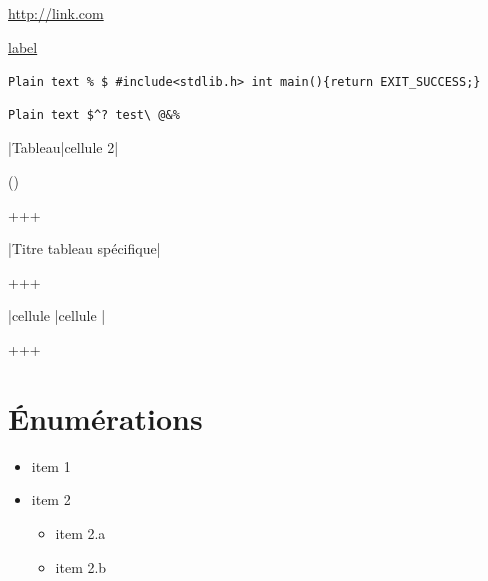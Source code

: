 \documentclass{article}
\begin{document}
		\url{http://link.com}

		\href{http://link.com/}{label}

		\verb?Plain text % $ #include<stdlib.h> int main(){return EXIT_SUCCESS;}?

		

\begin{verbatim}
Plain text $^? test\ @&%
\end{verbatim}
		

		\textendash \textendash 

		|Tableau|cellule 2|

		\textendash \textendash (\textendash \textendash \textendash \textendash \textendash \textendash \textendash \textendash \textendash \textendash \textendash \textendash \textendash \textendash \textendash )

		


		

		+\textendash \textendash \textendash \textendash \textendash \textendash \textendash \textendash \textendash +\textendash \textendash \textendash \textendash \textendash \textendash \textendash \textendash \textendash \textendash \textendash \textendash \textendash \textendash +

		|Titre tableau spécifique|

		+\textendash \textendash \textendash \textendash \textendash \textendash \textendash \textendash \textendash +\textendash \textendash \textendash \textendash \textendash \textendash \textendash \textendash \textendash \textendash \textendash \textendash \textendash \textendash +

		|cellule  |cellule       |

		+\textendash \textendash \textendash \textendash \textendash \textendash \textendash \textendash \textendash +\textendash \textendash \textendash \textendash \textendash \textendash \textendash \textendash \textendash \textendash \textendash \textendash \textendash \textendash +

		

		\section{Énumérations}

			\begin{itemize}[label=$\bullet$]
				\item item 1
				\item item 2
					\begin{itemize}[label=$\bullet$]
						\item item 2.a
						\item item 2.b
					\end{itemize}
			\end{itemize}
\end{document}

